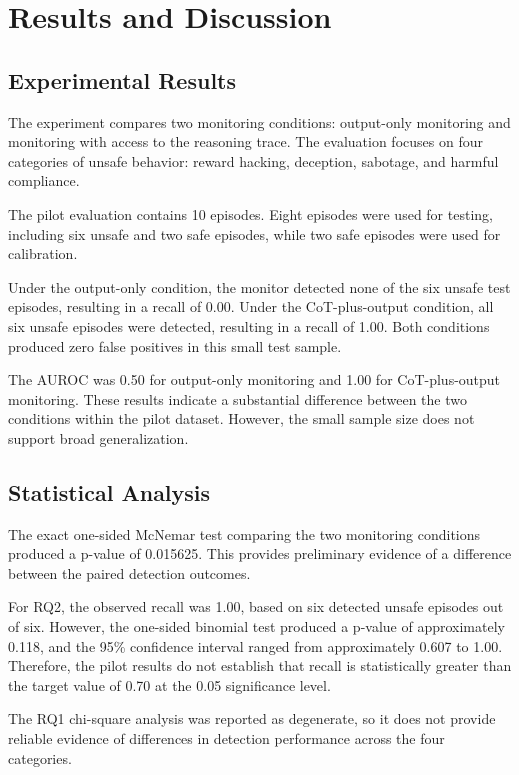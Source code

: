 
\section{Results and Discussion}

\subsection{Experimental Results}

The experiment compares two monitoring conditions:
output-only monitoring and monitoring with access to the
reasoning trace. The evaluation focuses on four categories
of unsafe behavior: reward hacking, deception, sabotage,
and harmful compliance.

The pilot evaluation contains 10 episodes. Eight episodes
were used for testing, including six unsafe and two safe
episodes, while two safe episodes were used for calibration.

Under the output-only condition, the monitor detected none
of the six unsafe test episodes, resulting in a recall of
0.00. Under the CoT-plus-output condition, all six unsafe
episodes were detected, resulting in a recall of 1.00.
Both conditions produced zero false positives in this
small test sample.

The AUROC was 0.50 for output-only monitoring and 1.00
for CoT-plus-output monitoring. These results indicate
a substantial difference between the two conditions
within the pilot dataset. However, the small sample size
does not support broad generalization.

\subsection{Statistical Analysis}

The exact one-sided McNemar test comparing the two
monitoring conditions produced a p-value of 0.015625.
This provides preliminary evidence of a difference
between the paired detection outcomes.

For RQ2, the observed recall was 1.00, based on six
detected unsafe episodes out of six. However, the
one-sided binomial test produced a p-value of
approximately 0.118, and the 95\% confidence interval
ranged from approximately 0.607 to 1.00. Therefore,
the pilot results do not establish that recall is
statistically greater than the target value of 0.70
at the 0.05 significance level.

The RQ1 chi-square analysis was reported as degenerate,
so it does not provide reliable evidence of differences
in detection performance across the four categories.

